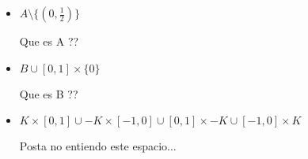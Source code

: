 \documentclass[11pt]{article}
\newcommand{\sett}[1]{\{#1\}}
\newenvironment{proof}[1][Demostraci\'on]{\begin{trivlist}
\item[\hskip \labelsep {\bfseries #1}]}{\end{trivlist}}
\begin{document}
\begin{enumerate}
\begin{proof}
\begin{itemize}
\item {$A \setminus \sett{(0,\frac{1}{2})}$}

Que es A ??

\item {$B \cup [0,1]\times \sett{0}$}

Que es B ??

\item {$K \times [0,1] \cup -K \times [-1,0] \cup [0,1] \times -K \cup [-1,0] \times K$}

Posta no entiendo este espacio...

\end{itemize}

\end{proof}



\end{enumerate}
\end{document}
